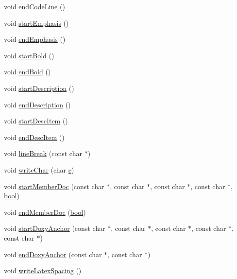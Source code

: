 \begin{DoxyCompactItemize}
void \hyperlink{class_man_generator_a0f0040036147c71754651d0701029f70}{end\+Code\+Line} ()
\item 
void \hyperlink{class_man_generator_a8a88956b0c96590290287835934344b9}{start\+Emphasis} ()
\item 
void \hyperlink{class_man_generator_a3e158ae587148e66ad6f3d4df509ca35}{end\+Emphasis} ()
\item 
void \hyperlink{class_man_generator_a93a20331a8e073df653ed1df9834361b}{start\+Bold} ()
\item 
void \hyperlink{class_man_generator_acc9e3c928bd473ce079e323f19948dc7}{end\+Bold} ()
\item 
void \hyperlink{class_man_generator_a40c97f2dcd8827c13a9d1eedb96701b5}{start\+Description} ()
\item 
void \hyperlink{class_man_generator_a04db9176fd114182d5aab2a48346621d}{end\+Description} ()
\item 
void \hyperlink{class_man_generator_a3230aa59d50e8bdbbfb94e56bd956f56}{start\+Desc\+Item} ()
\item 
void \hyperlink{class_man_generator_ab86f06d399e075e2b6855319bf26e1ec}{end\+Desc\+Item} ()
\item 
void \hyperlink{class_man_generator_a3c7ce366b7915a1c3dc6129182f0f9e8}{line\+Break} (const char $\ast$)
\item 
void \hyperlink{class_man_generator_a5831577a90e226daf7ad892dd8744d33}{write\+Char} (char \hyperlink{060__command__switch_8tcl_ab14f56bc3bd7680490ece4ad7815465f}{c})
\item 
void \hyperlink{class_man_generator_a16622bebadf9257bfb46939f3f892a58}{start\+Member\+Doc} (const char $\ast$, const char $\ast$, const char $\ast$, const char $\ast$, \hyperlink{qglobal_8h_a1062901a7428fdd9c7f180f5e01ea056}{bool})
\item 
void \hyperlink{class_man_generator_aa4f870d246564655e89f9d50647e5df0}{end\+Member\+Doc} (\hyperlink{qglobal_8h_a1062901a7428fdd9c7f180f5e01ea056}{bool})
\item 
void \hyperlink{class_man_generator_a76c670385ec8cf1dccf4f4f16494e79b}{start\+Doxy\+Anchor} (const char $\ast$, const char $\ast$, const char $\ast$, const char $\ast$, const char $\ast$)
\item 
void \hyperlink{class_man_generator_a47b84c3d099ed32ac6ad1875c84ccd24}{end\+Doxy\+Anchor} (const char $\ast$, const char $\ast$)
\item 
void \hyperlink{class_man_generator_adc7746d2f225bc7742dc0fd23fd9bf1e}{write\+Latex\+Spacing} ()
\item 

\end{DoxyCompactItemize}
